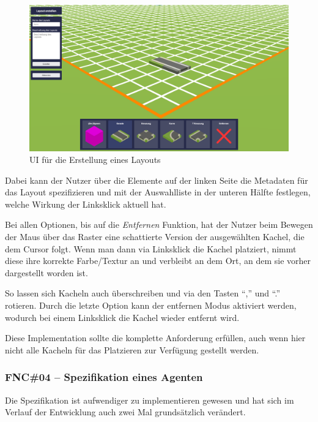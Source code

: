 \begin{figure}[htb]
    \centering
    \includegraphics[scale=.25,center]{medien/screenshots/place-ui.png}
    \caption{UI für die Erstellung eines Layouts}
    \ownsource
    \label{fig:place-ui}
\end{figure}

Dabei kann der Nutzer über die Elemente auf der linken Seite die Metadaten für das Layout spezifizieren und mit der Auswahlliste in der unteren Hälfte festlegen, welche Wirkung der Linksklick aktuell hat.

Bei allen Optionen, bis auf die \textit{Entfernen} Funktion, hat der Nutzer beim Bewegen der Maus über das Raster eine schattierte Version der ausgewählten Kachel, die dem Cursor folgt.
Wenn man dann via Linksklick die Kachel platziert, nimmt diese ihre korrekte Farbe/Textur an und verbleibt an dem Ort, an dem sie vorher dargestellt worden ist.

So lassen sich Kacheln auch überschreiben und via den Tasten \enquote{,} und \enquote{.} rotieren.
Durch die letzte Option kann der entfernen Modus aktiviert werden, wodurch bei einem Linksklick die Kachel wieder entfernt wird.

Diese Implementation sollte die komplette Anforderung erfüllen, auch wenn hier nicht alle Kacheln für das Platzieren zur Verfügung gestellt werden.


\subsubsection{FNC\#04 – Spezifikation eines Agenten}

Die Spezifikation ist aufwendiger zu implementieren gewesen und hat sich im Verlauf der Entwicklung auch zwei Mal grundsätzlich verändert.

